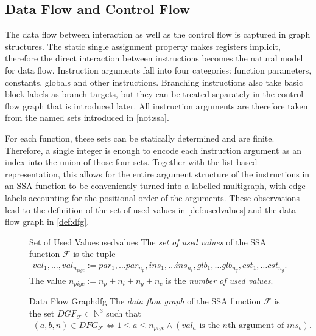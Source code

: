 \subsection{Data Flow and Control Flow}

    The data flow between interaction as well as the control flow is captured in
    graph structures.
    The static single assignment property makes registers implicit, therefore
    the direct interaction between instructions becomes the natural model for
    data flow.
    Instruction arguments fall into four categories: function parameters,
    constants, globals and other instructions.
    Branching instructions also take basic block labels as branch targets,
    but they can be treated separately in the control flow graph that is
    introduced later.
    All instruction arguments are therefore taken from the named sets introduced
    in \autoref{not:ssa}.

    For each function, these sets can be statically determined and are finite.
    Therefore, a single integer is enough to encode each instruction argument as
    an index into the union of those four sets.
    Together with the list based representation, this allows for the
    entire argument structure of the instructions in an SSA function to be
    conveniently turned into a labelled multigraph, with edge labels accounting
    for the positional order of the arguments.
    These observations lead to the definition of the set of used values in
    \autoref{def:usedvalues} and the data flow graph in \autoref{def:dfg}.

\begin{figure}[h]
\begin{definition}{Set of Used Values}{usedvalues}
    The {\em set of used values} of the SSA function $\mathcal F$ is the tuple
    \begin{align*}
       val_1,\dots,val_{n_{pigc}} := par_1,\dots par_{n_p},
                                     ins_1,\dots ins_{n_i},
                                     glb_1,\dots glb_{n_g},
                                     cst_1,\dots cst_{n_g}.
    \end{align*}
    The value $n_{pigc}:=n_p+n_i+n_g+n_c$ is the {\em number of used values}.
\end{definition}

\begin{definition}{Data Flow Graph}{dfg}
    The {\em data flow graph} of the SSA function $\mathcal F$ is the set
    $DGF_{\mathcal F}\subset \mathbb N^3$ such that
    \begin{align*}
        (a,b,n)\in DFG_{\mathcal F}\iff 1\leq a\leq n_{pigc}
            \mathrel{\land}(val_a\text{ is the $n$th argument of }ins_b).
    \end{align*}
\end{definition}
\end{figure}

